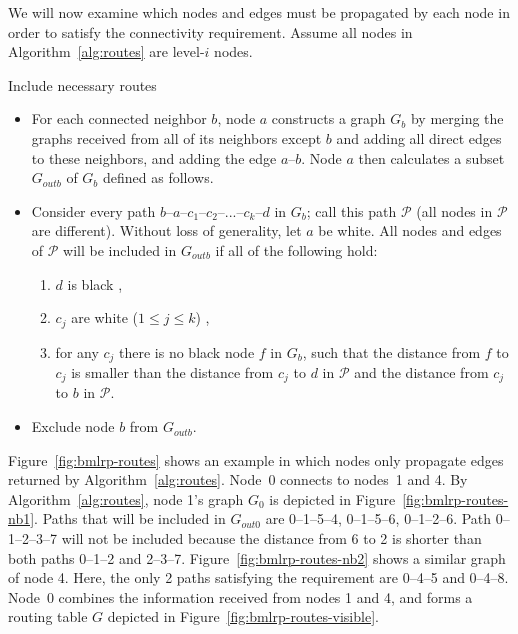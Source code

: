 \documentclass[conference]{IEEEtran}
\theoremstyle{definition}
\newcommand{\cP}{{\mathcal{P}}}
\begin{document}
We will now examine which nodes and edges must be propagated by each node in order to satisfy the connectivity requirement. Assume all nodes in Algorithm~\ref{alg:routes} are level-$i$ nodes.

\begin{algorithm}[H]
    \caption{Include necessary routes}
    \label{alg:routes}
    
    \begin{itemize} 
        \item   For each connected neighbor $b$, node $a$ constructs a graph $G_b$ by merging the graphs received from all of its neighbors except $b$ and adding all direct edges to these neighbors, and adding the edge $a$--$b$. Node $a$ then calculates a subset $G_{outb}$ of $G_b$ defined as follows.

        \item   Consider every path $b$--$a$--$c_1$--$c_2$--...--$c_k$--$d$ in $G_b$; call this path $\cP$ (all nodes in $\cP$ are different). Without loss of generality, let $a$ be white. All nodes and edges of $\cP$ will be included in $G_{outb}$ if all of the following hold:
        \begin{enumerate}
            \item   $d$ is black , 
            \item   $c_j$ are white ($1 \le j \le k$) ,
            \item   for any $c_j$ there is no black node $f$ in $G_b$, such that the distance
                    from $f$ to $c_j$ is smaller than the distance 
                    from $c_j$ to $d$ in $\cP$ and the distance from $c_j$ to $b$ in $\cP$.
        \end{enumerate}

        \item   Exclude node $b$ from $G_{outb}$.
    \end{itemize}
\end{algorithm}

Figure~\ref{fig:bmlrp-routes} shows an example in which nodes only propagate edges returned by Algorithm~\ref{alg:routes}. Node~0 connects to nodes~1 and 4. By Algorithm~\ref{alg:routes}, node 1's graph $G_0$ is depicted in Figure~\ref{fig:bmlrp-routes-nb1}. Paths that will be included in $G_{out0}$ are 0--1--5--4, 0--1--5--6, 0--1--2--6. Path 0--1--2--3--7 will not be included because the distance from 6 to 2 is shorter than both paths 0--1--2 and 2--3--7. Figure~\ref{fig:bmlrp-routes-nb2} shows a similar graph of node 4. Here, the only 2 paths satisfying the requirement are 0--4--5 and 0--4--8. Node~0 combines the information received from nodes 1 and 4, and forms a routing table $G$ depicted in Figure~\ref{fig:bmlrp-routes-visible}.
\end{document}
